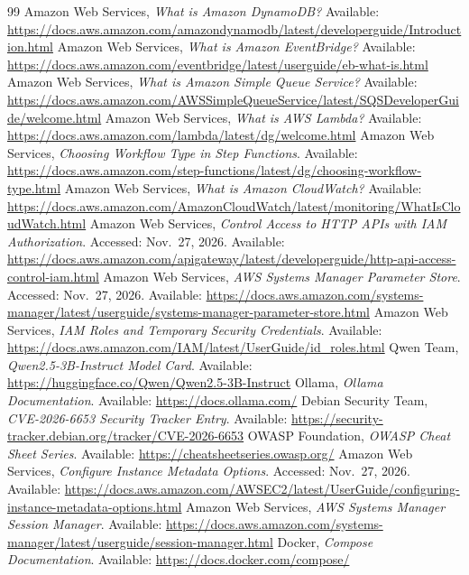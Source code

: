 \begin{thebibliography}{99}
 Amazon Web Services, \emph{What is Amazon DynamoDB?} Available: \url{https://docs.aws.amazon.com/amazondynamodb/latest/developerguide/Introduction.html}
 Amazon Web Services, \emph{What is Amazon EventBridge?} Available: \url{https://docs.aws.amazon.com/eventbridge/latest/userguide/eb-what-is.html}
 Amazon Web Services, \emph{What is Amazon Simple Queue Service?} Available: \url{https://docs.aws.amazon.com/AWSSimpleQueueService/latest/SQSDeveloperGuide/welcome.html}
 Amazon Web Services, \emph{What is AWS Lambda?} Available: \url{https://docs.aws.amazon.com/lambda/latest/dg/welcome.html}
 Amazon Web Services, \emph{Choosing Workflow Type in Step Functions}. Available: \url{https://docs.aws.amazon.com/step-functions/latest/dg/choosing-workflow-type.html}
 Amazon Web Services, \emph{What is Amazon CloudWatch?} Available: \url{https://docs.aws.amazon.com/AmazonCloudWatch/latest/monitoring/WhatIsCloudWatch.html}
 Amazon Web Services, \emph{Control Access to HTTP APIs with IAM Authorization}. Accessed: Nov.~27, 2026. Available: \url{https://docs.aws.amazon.com/apigateway/latest/developerguide/http-api-access-control-iam.html}
 Amazon Web Services, \emph{AWS Systems Manager Parameter Store}. Accessed: Nov.~27, 2026. Available: \url{https://docs.aws.amazon.com/systems-manager/latest/userguide/systems-manager-parameter-store.html}
 Amazon Web Services, \emph{IAM Roles and Temporary Security Credentials}. Available: \url{https://docs.aws.amazon.com/IAM/latest/UserGuide/id_roles.html}
 Qwen Team, \emph{Qwen2.5-3B-Instruct Model Card}. Available: \url{https://huggingface.co/Qwen/Qwen2.5-3B-Instruct}
 Ollama, \emph{Ollama Documentation}. Available: \url{https://docs.ollama.com/}
 Debian Security Team, \emph{CVE-2026-6653 Security Tracker Entry}. Available: \url{https://security-tracker.debian.org/tracker/CVE-2026-6653}
 OWASP Foundation, \emph{OWASP Cheat Sheet Series}. Available: \url{https://cheatsheetseries.owasp.org/}
 Amazon Web Services, \emph{Configure Instance Metadata Options}. Accessed: Nov.~27, 2026. Available: \url{https://docs.aws.amazon.com/AWSEC2/latest/UserGuide/configuring-instance-metadata-options.html}
 Amazon Web Services, \emph{AWS Systems Manager Session Manager}. Available: \url{https://docs.aws.amazon.com/systems-manager/latest/userguide/session-manager.html}
 Docker, \emph{Compose Documentation}. Available: \url{https://docs.docker.com/compose/}

\end{thebibliography}
